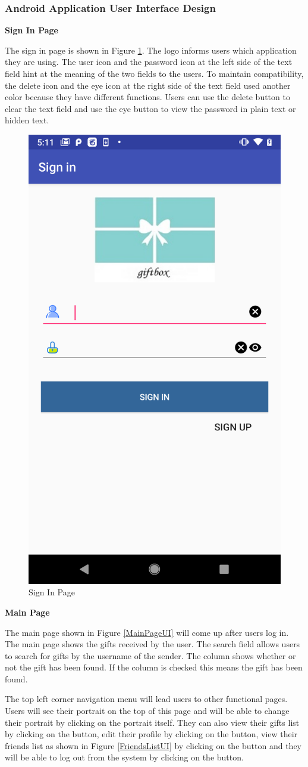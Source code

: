 \subsubsection{Android Application User Interface Design}
\textbf{Sign In Page}
\par The sign in page is shown in Figure \ref{SignInUI}. The logo informs users which application they are using. The user icon and the password icon at the left side of the text field hint at the meaning of the two fields to the users. To maintain compatibility, the delete icon and the eye icon at the right side of the text field used another color because they have different functions. Users can use the delete button to clear the text field and use the eye button to view the password in plain text or hidden text.
\begin{figure}[H]
\centering
\includegraphics[width=.45\textwidth]{section03/assets/SignIn.png}
\caption[Sign In Page]{\label{SignInUI}Sign In Page}
\end{figure}

\textbf{Main Page}
\par The main page shown in Figure \ref{MainPageUI} will come up after users log in. The main page shows the gifts received by the user. The search field allows users to search for gifts by the username of the sender. The  column shows whether or not the gift has been found. If the  column is checked this means the gift has been found.
\par The top left corner navigation menu will lead users to other functional pages. Users will see their portrait on the top of this page and will be able to change their portrait by clicking on the portrait itself. They can also view their gifts list by clicking on the  button, edit their profile by clicking on the  button, view their friends list as shown in Figure \ref{FriendsListUI} by clicking on the  button and they will be able to log out from the system by clicking on the  button. 

